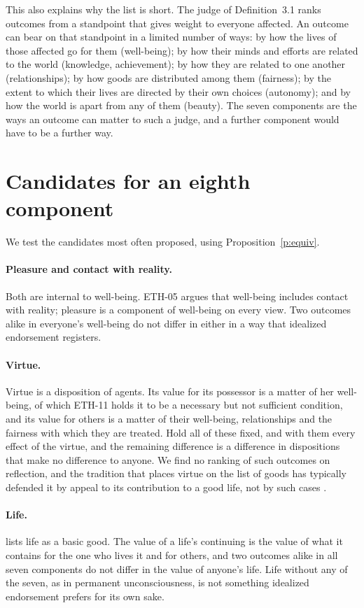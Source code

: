 \documentclass{situationist-preprint}
\begin{document}
This also explains why the list is short. The judge of Definition~3.1 ranks outcomes from a standpoint that gives weight to everyone affected. An outcome can bear on that standpoint in a limited number of ways: by how the lives of those affected go for them (well-being); by how their minds and efforts are related to the world (knowledge, achievement); by how they are related to one another (relationships); by how goods are distributed among them (fairness); by the extent to which their lives are directed by their own choices (autonomy); and by how the world is apart from any of them (beauty). The seven components are the ways an outcome can matter to such a judge, and a further component would have to be a further way.

\section{Candidates for an eighth component}

We test the candidates most often proposed, using Proposition~\ref{p:equiv}.

\paragraph{Pleasure and contact with reality.} Both are internal to well-being. ETH-05 argues that well-being includes contact with reality; pleasure is a component of well-being on every view. Two outcomes alike in everyone's well-being do not differ in either in a way that idealized endorsement registers.

\paragraph{Virtue.} Virtue is a disposition of agents. Its value for its possessor is a matter of her well-being, of which ETH-11 holds it to be a necessary but not sufficient condition, and its value for others is a matter of their well-being, relationships and the fairness with which they are treated. Hold all of these fixed, and with them every effect of the virtue, and the remaining difference is a difference in dispositions that make no difference to anyone. We find no ranking of such outcomes on reflection, and the tradition that places virtue on the list of goods has typically defended it by appeal to its contribution to a good life, not by such cases \citep{Hurka1993}.

\paragraph{Life.} \citet{Finnis1980} lists life as a basic good. The value of a life's continuing is the value of what it contains for the one who lives it and for others, and two outcomes alike in all seven components do not differ in the value of anyone's life. Life without any of the seven, as in permanent unconsciousness, is not something idealized endorsement prefers for its own sake.
\end{document}
